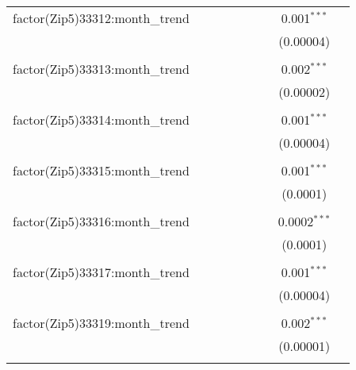 \begin{table}[H]
{\begin{tabular}{@{\extracolsep{5pt}}lcccccccc}
  factor(Zip5)33312:month\_trend &  &  &  &  &  &  & 0.001$^{***}$ &  \\  

   &  &  &  &  &  &  & (0.00004) &  \\  

   & & & & & & & & \\  

  factor(Zip5)33313:month\_trend &  &  &  &  &  &  & 0.002$^{***}$ &  \\  

   &  &  &  &  &  &  & (0.00002) &  \\  

   & & & & & & & & \\  

  factor(Zip5)33314:month\_trend &  &  &  &  &  &  & 0.001$^{***}$ &  \\  

   &  &  &  &  &  &  & (0.00004) &  \\  

   & & & & & & & & \\  

  factor(Zip5)33315:month\_trend &  &  &  &  &  &  & 0.001$^{***}$ &  \\  

   &  &  &  &  &  &  & (0.0001) &  \\  

   & & & & & & & & \\  

  factor(Zip5)33316:month\_trend &  &  &  &  &  &  & 0.0002$^{***}$ &  \\  

   &  &  &  &  &  &  & (0.0001) &  \\  

   & & & & & & & & \\  

  factor(Zip5)33317:month\_trend &  &  &  &  &  &  & 0.001$^{***}$ &  \\  

   &  &  &  &  &  &  & (0.00004) &  \\  

   & & & & & & & & \\  

  factor(Zip5)33319:month\_trend &  &  &  &  &  &  & 0.002$^{***}$ &  \\  

   &  &  &  &  &  &  & (0.00001) &  \\  

   & & & & & & & & \\  


\end{tabular}}
\end{table}
